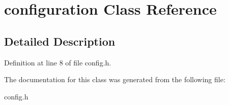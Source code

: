 \hypertarget{classconfiguration}{}\section{configuration Class Reference}
\label{classconfiguration}


\subsection{Detailed Description}


Definition at line 8 of file config.\+h.



The documentation for this class was generated from the following file\+:\begin{DoxyCompactItemize}
\item 
config.\+h\end{DoxyCompactItemize}
